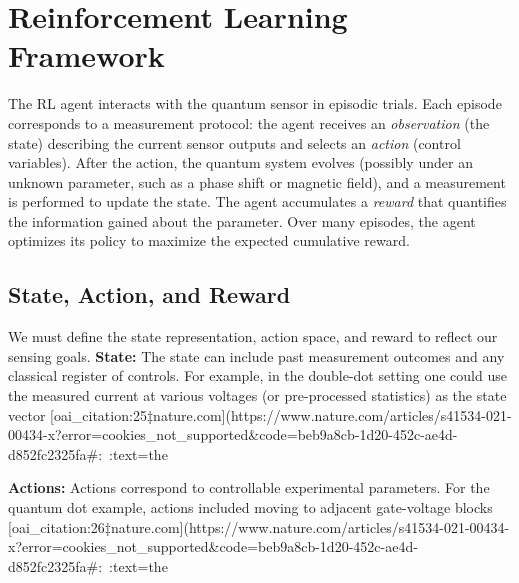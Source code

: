 \documentclass[12pt]{article}
\begin{document}
\section{Reinforcement Learning Framework}
The RL agent interacts with the quantum sensor in episodic trials.  Each episode corresponds to a measurement protocol: the agent receives an {\it observation} (the state) describing the current sensor outputs and selects an {\it action} (control variables).  After the action, the quantum system evolves (possibly under an unknown parameter, such as a phase shift or magnetic field), and a measurement is performed to update the state.  The agent accumulates a {\it reward} that quantifies the information gained about the parameter.  Over many episodes, the agent optimizes its policy to maximize the expected cumulative reward.

\subsection{State, Action, and Reward}
We must define the state representation, action space, and reward to reflect our sensing goals.  {\bf State:} The state can include past measurement outcomes and any classical register of controls.  For example, in the double-dot setting one could use the measured current at various voltages (or pre-processed statistics) as the state vector [oai_citation:25‡nature.com](https://www.nature.com/articles/s41534-021-00434-x?error=cookies_not_supported&code=beb9a8cb-1d20-452c-ae4d-d852fc2325fa#:~:text=the%

{\bf Actions:} Actions correspond to controllable experimental parameters.  For the quantum dot example, actions included moving to adjacent gate-voltage blocks [oai_citation:26‡nature.com](https://www.nature.com/articles/s41534-021-00434-x?error=cookies_not_supported&code=beb9a8cb-1d20-452c-ae4d-d852fc2325fa#:~:text=the%
\end{document}

